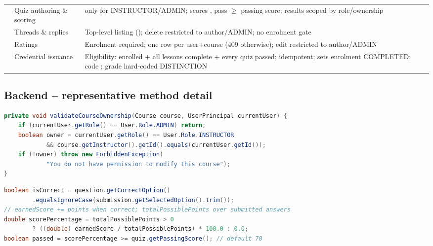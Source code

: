 \begin{table}[H]
\begin{tabular}{@{}L{3.0cm}L{5.4cm}L{5.8cm}@{}}
 & Quiz authoring \& scoring &  only for INSTRUCTOR/ADMIN;  scores , pass $\geq$ passing score; results scoped by role/ownership \\
 & Threads \& replies & Top-level listing (); delete restricted to author/ADMIN; no enrolment gate \\
 & Ratings & Enrolment required; one row per user+course (409 otherwise); edit restricted to author/ADMIN \\
 & Credential issuance & Eligibility: enrolled + all lessons complete + every quiz passed; idempotent; sets enrolment COMPLETED; code ; grade hard-coded DISTINCTION \\
\bottomrule
\end{tabular}
\end{table}

\subsection{Backend -- representative method detail}

\begin{lstlisting}[language=Java,caption={Ownership check used by course/lesson/quiz mutations (CourseService.validateCourseOwnership)}]
private void validateCourseOwnership(Course course, UserPrincipal currentUser) {
    if (currentUser.getRole() == User.Role.ADMIN) return;
    boolean owner = currentUser.getRole() == User.Role.INSTRUCTOR
            && course.getInstructor().getId().equals(currentUser.getId());
    if (!owner) throw new ForbiddenException(
            "You do not have permission to modify this course");
}
\end{lstlisting}

\begin{lstlisting}[language=Java,caption={Authoritative quiz scoring rule (QuizService.submitQuiz excerpt)}]
boolean isCorrect = question.getCorrectOption()
        .equalsIgnoreCase(submission.getSelectedOption().trim());
// earnedScore += points when correct; totalPossiblePoints over submitted answers
double scorePercentage = totalPossiblePoints > 0
        ? ((double) earnedScore / totalPossiblePoints) * 100.0 : 0.0;
boolean passed = scorePercentage >= quiz.getPassingScore(); // default 70
\end{lstlisting}


